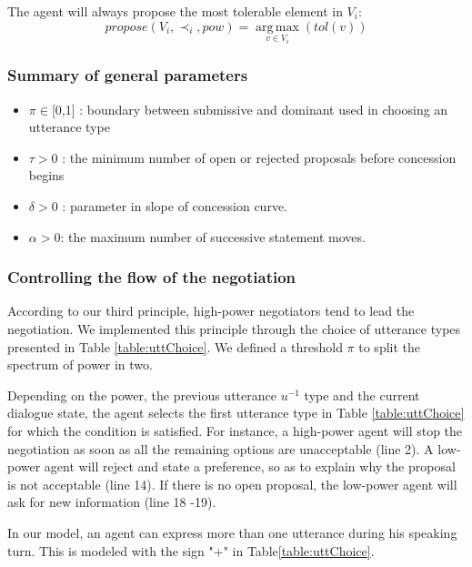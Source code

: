 \documentclass{llncs}
\begin{document}
		\noindent
		The agent will always propose the most tolerable element in $V_i$:
		\begin{equation}
			propose(V_i, \prec_i,pow) =  \operatorname*{arg\,max}_{v \in V_i} ( tol(v))
		\end{equation}

		\subsubsection*{Summary of general parameters }
	\begin{itemize}[noitemsep]
		
		\item $\pi \in $[0,1] : boundary between submissive and dominant used in
		choosing an utterance type
		\item $\tau > 0$ : the minimum number of open or rejected proposals before concession begins
		\item $\delta > 0$ : parameter in slope of concession curve.
		\item $\alpha> 0$: the maximum number of successive statement moves.
	\end{itemize}

		\subsubsection{Controlling the flow of the negotiation}
		According to our third principle, high-power negotiators tend to lead the negotiation. We implemented this principle through the choice of utterance types presented in Table \ref{table:uttChoice}.		
		We defined a threshold $\pi$ to split the spectrum of power in two.
		
		Depending on the power, the previous utterance $u^{-1}$ type and the current dialogue state, the agent selects the first utterance type in Table \ref{table:uttChoice} for which the condition is satisfied. For instance, a high-power agent will stop the negotiation as soon as all the remaining options are unacceptable (line 2). A low-power agent will reject and state a preference, so as to explain why the proposal is not acceptable (line 14). If there is no open proposal, the low-power agent will ask for new information (line 18 -19).
		
		In our model, an agent can express more than one utterance during his speaking turn. This is modeled  with the sign "+" in Table\ref{table:uttChoice}.
		
\end{document}
